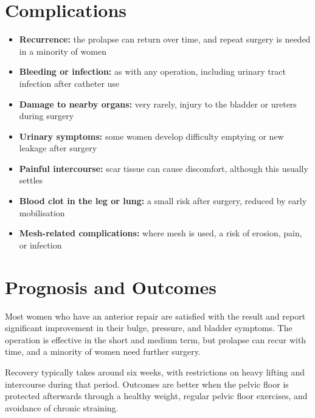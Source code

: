 \section*{Complications}
\begin{itemize}
    \item \textbf{Recurrence:} the prolapse can return over time, and repeat surgery is needed in a minority of women
    \item \textbf{Bleeding or infection:} as with any operation, including urinary tract infection after catheter use
    \item \textbf{Damage to nearby organs:} very rarely, injury to the bladder or ureters during surgery
    \item \textbf{Urinary symptoms:} some women develop difficulty emptying or new leakage after surgery
    \item \textbf{Painful intercourse:} scar tissue can cause discomfort, although this usually settles
    \item \textbf{Blood clot in the leg or lung:} a small risk after surgery, reduced by early mobilisation
    \item \textbf{Mesh-related complications:} where mesh is used, a risk of erosion, pain, or infection
\end{itemize}

\section*{Prognosis and Outcomes}
Most women who have an anterior repair are satisfied with the result and report significant improvement in their bulge, pressure, and bladder symptoms. The operation is effective in the short and medium term, but prolapse can recur with time, and a minority of women need further surgery.

Recovery typically takes around six weeks, with restrictions on heavy lifting and intercourse during that period. Outcomes are better when the pelvic floor is protected afterwards through a healthy weight, regular pelvic floor exercises, and avoidance of chronic straining.

